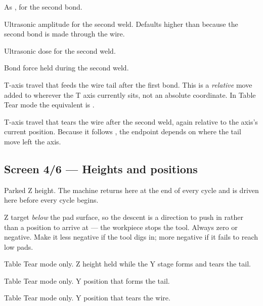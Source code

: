 \begin{description}[leftmargin=!,labelwidth=26mm,style=nextline,font=\normalfont\ttfamily]
\item[Search 2] As , for the second bond.
\item[Power 2] Ultrasonic amplitude for the second weld. Defaults higher than
   because the second bond is made through the wire.
\item[Energy 2] Ultrasonic dose for the second weld.
\item[Force 2 G] Bond force held during the second weld.
\item[Tail] T-axis travel that feeds the wire tail after the first bond. This
  is a \emph{relative} move added to wherever the T axis currently sits, not an
  absolute coordinate. In Table Tear mode the equivalent is
  .
\item[Tear] T-axis travel that tears the wire after the second weld, again
  relative to the axis's current position. Because it follows ,
  the endpoint depends on where the tail move left the axis.
\end{description}


\subsection*{Screen 4/6 --- Heights and positions}


\begin{description}[leftmargin=!,labelwidth=26mm,style=nextline,font=\normalfont\ttfamily]
\item[Reset Height] Parked Z height. The machine returns here at the end of
  every cycle and is driven here before every cycle begins.
\item[Overtravel] Z target \emph{below} the pad surface, so the descent is a
  direction to push in rather than a position to arrive at --- the workpiece
  stops the tool. Always zero or negative. Make it less negative if the tool
  digs in; more negative if it fails to reach low pads.
\item[Second Z Hgt] Table Tear mode only. Z height held while the Y stage forms
  and tears the tail.
\item[Table Tail] Table Tear mode only. Y position that forms the tail.
\item[Table Tear] Table Tear mode only. Y position that tears the wire.
\end{description}


